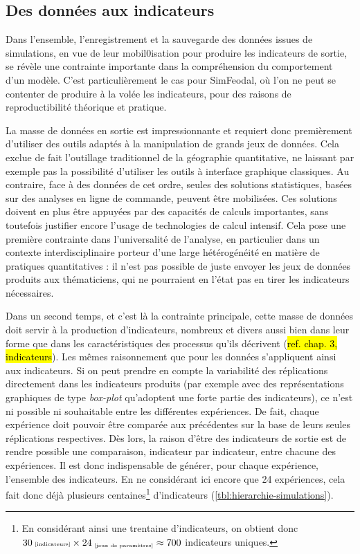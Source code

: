 	\subsection{Des données aux indicateurs}\label{subsec:donnees-indicateurs}
	Dans l'ensemble, l'enregistrement et la sauvegarde des données issues de simulations, en vue de leur mobil0isation pour produire les indicateurs de sortie, se révèle une contrainte importante dans la compréhension du comportement d'un modèle.
	C'est particulièrement le cas pour SimFeodal, où l'on ne peut se contenter de produire à la volée les indicateurs, pour des raisons de reproductibilité théorique et pratique.
	
	La masse de données en sortie est impressionnante et requiert donc premièrement d'utiliser des outils adaptés à la manipulation de grands jeux de données.
	Cela exclue de fait l'outillage traditionnel de la géographie quantitative, ne laissant par exemple pas la possibilité d'utiliser les outils à interface graphique classiques.
	Au contraire, face à des données de cet ordre, seules des solutions statistiques, basées sur des analyses en ligne de commande, peuvent être mobilisées.
	Ces solutions doivent en plus être appuyées par des capacités de calculs importantes, sans toutefois justifier encore l'usage de technologies de calcul intensif.
	Cela pose une première contrainte dans l'universalité de l'analyse, en particulier dans un contexte interdisciplinaire porteur d'une large hétérogénéité en matière de pratiques quantitatives : il n'est pas possible de juste envoyer les jeux de données produits aux thématiciens, qui ne pourraient en l'état pas en tirer les indicateurs nécessaires.

	Dans un second temps, et c'est là la contrainte principale, cette masse de données doit servir à la production d'indicateurs, nombreux et divers aussi bien dans leur forme que dans les caractéristiques des processus qu'ils décrivent (\hl{ref. chap. 3, indicateurs}).
	Les mêmes raisonnement que pour les données s'appliquent ainsi aux indicateurs.
	Si on peut prendre en compte la variabilité des réplications directement dans les indicateurs produits (par exemple avec des représentations graphiques de type \textit{box-plot} qu'adoptent une forte partie des indicateurs), ce n'est ni possible ni souhaitable entre les différentes expériences.
	De fait, chaque expérience doit pouvoir être comparée aux précédentes sur la base de leurs seules réplications respectives.
	Dès lors, la raison d'être des indicateurs de sortie est de rendre possible une comparaison, indicateur par indicateur, entre chacune des expériences. 
	Il est donc indispensable de générer, pour chaque expérience, l'ensemble des indicateurs. En ne considérant ici encore que 24 expériences, cela fait donc déjà plusieurs centaines\footnote{
	En considérant ainsi une trentaine d'indicateurs, on obtient donc $30{\text{\tiny ~[indicateurs]}} \times 24_{\text{\tiny ~[jeux de paramètres]}} \approx 700$ indicateurs uniques.
	} d'indicateurs (\cref{tbl:hierarchie-simulations}).

